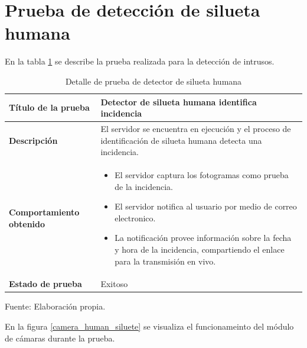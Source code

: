 \section{Prueba de detección de silueta humana}

En la tabla \ref{table_human_siluete} se describe la prueba realizada para la detección de intrusos.

\begin{table}[H]
    \caption{Detalle de prueba de detector de silueta humana}
    \begin{center}
        \begin{tabular}{|>{\centering}p{}|m{}<{\centering}|} 
            \hline
            \textbf{Título de la prueba} & \textbf{Detector de silueta humana identifica incidencia} \\
            \hline
            \textbf{Descripción} & El servidor se encuentra en ejecución y el proceso de identificación de silueta humana detecta una incidencia.\\
            \hline
            \textbf{Comportamiento obtenido} & 
            \begin{itemize}
                \item El servidor captura los fotogramas como prueba de la incidencia.
                \item El servidor notifica al usuario por medio de correo electronico.
                \item La notificación provee información sobre la fecha y hora de la incidencia, compartiendo el enlace para la transmisión en vivo.
            \end{itemize} \\ 
            \hline
            \textbf{Estado de prueba} & Exitoso \\
            \hline
        \end{tabular}
    \end{center}
    \begin{center}
        Fuente: Elaboración propia.
        \label{table_human_siluete}
    \end{center}
\end{table}

En la figura \ref{camera_human_siluete} se visualiza el funcionameinto del módulo de cámaras durante la prueba.

